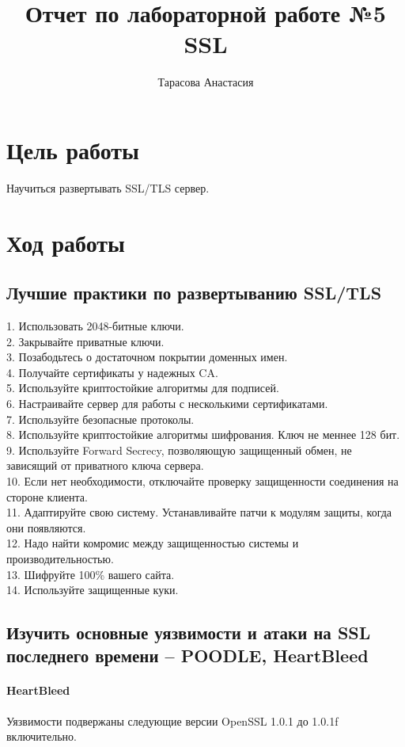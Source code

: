 \documentclass[12pt,a4paper]{article}
\author{Тарасова Анастасия}
\title{Отчет по лабораторной работе №5 SSL}
\begin{document}
\maketitle
\section{Цель работы}
Научиться развертывать SSL/TLS сервер.
\section{Ход работы}

\subsection{Лучшие практики по развертыванию SSL/TLS}
1. Использовать 2048-битные ключи.\\
2. Закрывайте приватные ключи.\\
3. Позабодьтесь о достаточном покрытии доменных имен.\\
4. Получайте сертификаты у надежных CA.\\
5. Используйте криптостойкие алгоритмы для подписей.\\
6. Настраивайте сервер для работы с несколькими сертификатами.\\
7. Используйте безопасные протоколы.\\
8. Используйте криптостойкие алгоритмы шифрования. Ключ не меннее 128 бит.\\
9. Используйте Forward Secrecy, позволяющую защищенный обмен, не зависящий от приватного ключа сервера.\\
10. Если нет необходимости, отключайте проверку защищенности соединения на стороне клиента.\\
11. Адаптируйте свою систему. Устанавливайте патчи к модулям защиты, когда они появляются.\\
12. Надо найти комромис между защищенностью системы и производительностью.\\
13. Шифруйте 100\% вашего сайта.\\
14. Используйте защищенные куки.\\

\subsection{Изучить основные уязвимости и атаки на SSL последнего времени – POODLE, HeartBleed}

\paragraph{HeartBleed}
Уязвимости подвержаны следующие версии
OpenSSL 1.0.1 до 1.0.1f включительно.
\end{document}

